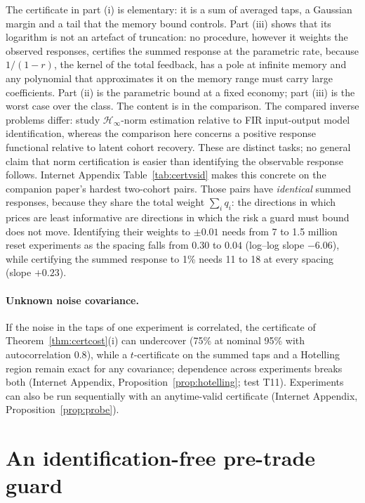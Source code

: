 \documentclass[12pt]{article}
\theoremstyle{definition}
\theoremstyle{remark}
\begin{document}
The certificate in part (i) is elementary: it is a sum of averaged taps, a Gaussian margin and a tail that the memory bound controls. Part (iii) shows that its logarithm is not an artefact of truncation: no procedure, however it weights the observed responses, certifies the summed response at the parametric rate, because $1/(1-r)$, the kernel of the total feedback, has a pole at infinite memory and any polynomial that approximates it on the memory range must carry large coefficients. Part (ii) is the parametric bound at a fixed economy; part (iii) is the worst case over the class. The content is in the comparison. The compared inverse problems differ: \citet{tu2018} study $\mathcal H_\infty$-norm estimation relative to FIR input-output model identification, whereas the comparison here concerns a positive response functional relative to latent cohort recovery. These are distinct tasks; no general claim that norm certification is easier than identifying the observable response follows. Internet Appendix Table~\ref{tab:certvsid} makes this concrete on the companion paper's hardest two-cohort pairs. Those pairs have \emph{identical} summed responses, because they share the total weight $\sum_iq_i$: the directions in which prices are least informative are directions in which the risk a guard must bound does not move. Identifying their weights to $\pm0.01$ needs from 7 to 1.5 million reset experiments as the spacing falls from $0.30$ to $0.04$ (log--log slope $-6.06$), while certifying the summed response to 1\% needs 11 to 18 at every spacing (slope $+0.23$).





\paragraph{Unknown noise covariance.} If the noise in the taps of one experiment is correlated, the certificate of Theorem~\ref{thm:certcost}(i) can undercover (75\% at nominal 95\% with autocorrelation $0.8$), while a $t$-certificate on the summed taps and a Hotelling region remain exact for any covariance; dependence across experiments breaks both (Internet Appendix, Proposition~\ref{prop:hotelling}; test T11). Experiments can also be run sequentially with an anytime-valid certificate (Internet Appendix, Proposition~\ref{prop:probe}).

\section{An identification-free pre-trade guard}\label{sec:guard}
\end{document}
